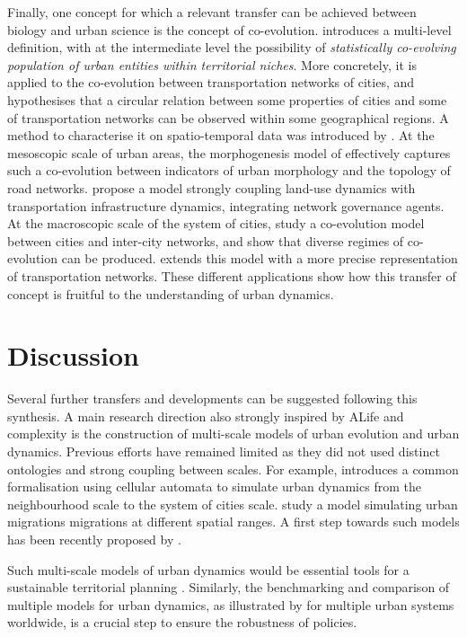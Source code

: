 \documentclass[letterpaper]{article}
\begin{document}
Finally, one concept for which a relevant transfer can be achieved between biology and urban science is the concept of co-evolution. \cite{raimbault2018caracterisation} introduces a multi-level definition, with at the intermediate level the possibility of \emph{statistically co-evolving population of urban entities within territorial niches}. More concretely, it is applied to the co-evolution between transportation networks of cities, and hypothesises that a circular relation between some properties of cities and some of transportation networks can be observed within some geographical regions. A method to characterise it on spatio-temporal data was introduced by \cite{raimbault2017identification}. At the mesoscopic scale of urban areas, the morphogenesis model of \cite{raimbault2019generating} effectively captures such a co-evolution between indicators of urban morphology and the topology of road networks. \cite{le2015modeling} propose a model strongly coupling land-use dynamics with transportation infrastructure dynamics, integrating network governance agents. At the macroscopic scale of the system of cities, \cite{raimbault2018modeling} study a co-evolution model between cities and inter-city networks, and show that diverse regimes of co-evolution can be produced. \cite{raimbault2020hierarchy} extends this model with a more precise representation of transportation networks. These different applications show how this transfer of concept is fruitful to the understanding of urban dynamics.


\section{Discussion}


Several further transfers and developments can be suggested following this synthesis. A main research direction also strongly inspired by ALife and complexity is the construction of multi-scale models of urban evolution and urban dynamics. Previous efforts have remained limited as they did not used distinct ontologies and strong coupling between scales. For example, \cite{batty2005agents} introduces a common formalisation using cellular automata to simulate urban dynamics from the neighbourhood scale to the system of cities scale. \cite{murcio2015urban} study a model simulating urban migrations migrations at different spatial ranges. A first step towards such models has been recently proposed by \cite{raimbault2021strong}.


Such multi-scale models of urban dynamics would be essential tools for a sustainable territorial planning \citep{rozenblat2018conclusion}. Similarly, the benchmarking and comparison of multiple models for urban dynamics, as illustrated by \cite{raimbault2020empowering} for multiple urban systems worldwide, is a crucial step to ensure the robustness of policies.
\end{document}
